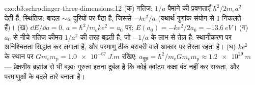\begin{solution}{exo:b3:schrodinger-three-dimensions:12}
(क) गतिज: $1/a$ पैमाने की प्रवणताएँ $\hbar^2/2m_{\text{e}}
a^2$ देती हैं; स्थितिज: बादल $\sim a$ दूरियों पर बैठा है, जिससे
$-ke^2/a$ (यथार्थ गुणांक संयोग से $1$ निकलते हैं)। (ख) $\dd E/\dd
a = 0$, $a = \hbar^2/m_{\text{e}}ke^2 = a_0$ पर; $E(a_0) =
-ke^2/2a_0 = \qty{-13.6}{eV}$। (ग) $a_0$ से नीचे गतिज कीमत
$1/a^2$ की तरह बढ़ती है, जो $-1/a$ के लाभ से तेज़ है: स्थानीकरण पर
अनिश्चितता सिद्धांत कर लगाता है, और परमाणु ठीक बराबरी वाले आकार पर
तैरता रहता है। (घ) $ke^2$ के स्थान पर $Gm_{\text{e}}m_{\text{p}} =
\qty{1.0e-67}{J.m}$ रखिए: $a_{\text{गुरु}} = \hbar^2/m_{\text{e}}G
m_{\text{e}}m_{\text{p}} \approx \qty{1.2e29}{m}$ --- प्रेक्षणीय
ब्रह्मांड से भी बड़ा: गुरुत्व इतना दुर्बल है कि कोई क्वांटम कक्षा बंद
नहीं कर सकता, और परमाणुओं के बदले तारे बनाता है।
\end{solution}

